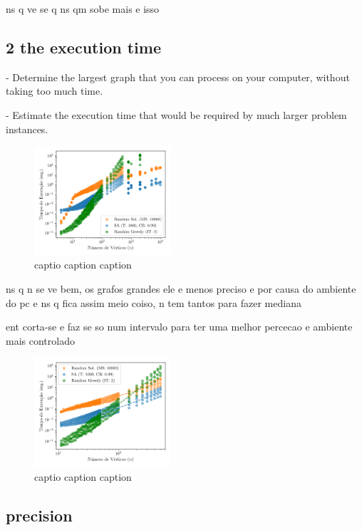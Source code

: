 \documentclass[mirror, portugues]{revdetua}
\begin{document}
ns q ve se q ns qm sobe mais e isso


\subsection{2 the execution time }

- Determine the largest graph that you can process on your computer, without taking too much time.

- Estimate the execution time that would be required by much larger problem instances.

\begin{figure}[H]
    \centering
    \includegraphics[width=0.45\textwidth]{../assets/time_all.png}
    \caption{captio caption caption}
    \label{fig:time_all}
\end{figure}

ns q n se ve bem, os grafos grandes ele e menos preciso e por causa do ambiente do pc e ns q fica assim meio coiso, n tem tantos para fazer mediana

ent corta-se e faz se so num intervalo para ter uma melhor percecao e ambiente mais controlado

\begin{figure}[H]
    \centering
    \includegraphics[width=0.45\textwidth]{../assets/time_interval.png}
    \caption{captio caption caption}
    \label{fig:time_interval}
\end{figure}



\subsection{precision}
\end{document}
